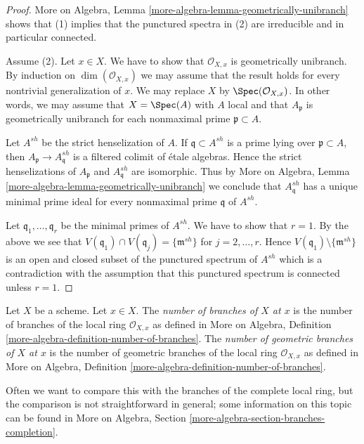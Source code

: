 \begin{proof}
More on Algebra, Lemma \ref{more-algebra-lemma-geometrically-unibranch}
shows that (1) implies that the punctured spectra in (2) are
irreducible and in particular connected.

\medskip\noindent
Assume (2). Let $x \in X$. We have to show that $\mathcal{O}_{X, x}$
is geometrically unibranch. By induction on $\dim(\mathcal{O}_{X, x})$
we may assume that the result holds for every nontrivial generalization of $x$.
We may replace $X$ by $\Spec(\mathcal{O}_{X, x})$. In other words,
we may assume that $X = \Spec(A)$ with $A$ local and that
$A_\mathfrak p$ is geometrically unibranch for each nonmaximal
prime $\mathfrak p \subset A$.

\medskip\noindent
Let $A^{sh}$ be the strict henselization of $A$. If
$\mathfrak q \subset A^{sh}$ is a prime lying over $\mathfrak p \subset A$,
then $A_\mathfrak p \to A^{sh}_\mathfrak q$ is a
filtered colimit of \'etale algebras. Hence the strict henselizations of
$A_\mathfrak p$ and $A^{sh}_\mathfrak q$ are isomorphic.
Thus by More on Algebra, Lemma \ref{more-algebra-lemma-geometrically-unibranch}
we conclude that $A^{sh}_\mathfrak q$
has a unique minimal prime ideal for every nonmaximal prime $\mathfrak q$ of
$A^{sh}$.

\medskip\noindent
Let $\mathfrak q_1, \ldots, \mathfrak q_r$ be the minimal primes
of $A^{sh}$. We have to show that $r = 1$. By the above
we see that $V(\mathfrak q_1) \cap V(\mathfrak q_j) = \{\mathfrak m^{sh}\}$
for $j = 2, \ldots, r$. Hence $V(\mathfrak q_1) \setminus \{\mathfrak m^{sh}\}$
is an open and closed subset of the punctured spectrum of $A^{sh}$
which is a contradiction with the assumption that this punctured spectrum
is connected unless $r = 1$.
\end{proof}

\begin{definition}
\label{definition-number-of-branches}
Let $X$ be a scheme. Let $x \in X$. The {\it number of branches of $X$
at $x$} is the number of branches of the local ring $\mathcal{O}_{X, x}$
as defined in
More on Algebra, Definition \ref{more-algebra-definition-number-of-branches}.
The {\it number of geometric branches of $X$ at $x$} is the number of
geometric branches of the local ring $\mathcal{O}_{X, x}$ as defined in
More on Algebra, Definition \ref{more-algebra-definition-number-of-branches}.
\end{definition}

\noindent
Often we want to compare this with the branches of the complete local
ring, but the comparison is not straightforward in general; some information
on this topic can be found in More on Algebra, Section
\ref{more-algebra-section-branches-completion}.

